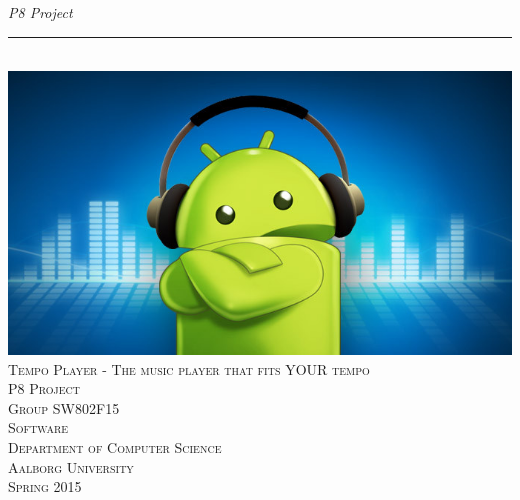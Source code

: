 \thispagestyle{empty}
\begin{flushright}
\vspace{3cm}

\phantom{hul}

\phantom{hul}

\phantom{hul}

\textsl{P8 Project} \\ \vspace{1cm}

\rule{1\textwidth}{3mm} \\ \vspace{1.5cm}
\includegraphics[width=\textwidth]{Images/frontpage.jpg}
\vspace{1.5cm} \\
\textsc{\Large Tempo Player - The music player that fits YOUR tempo \\
P8 Project\\
Group SW802F15\\
Software\\
Department of Computer Science\\
Aalborg University\\
Spring 2015\\
~\\
}

\end{flushright}
